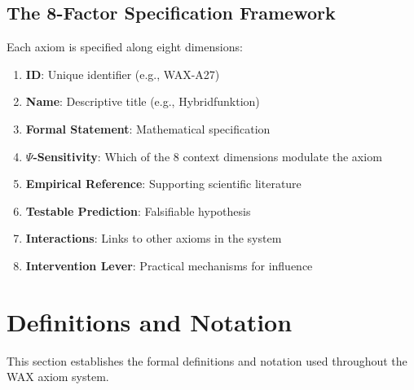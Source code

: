 \subsection{The 8-Factor Specification Framework}

Each axiom is specified along eight dimensions:

\begin{enumerate}
\item \textbf{ID}: Unique identifier (e.g., WAX-A27)
\item \textbf{Name}: Descriptive title (e.g., Hybridfunktion)
\item \textbf{Formal Statement}: Mathematical specification
\item \textbf{$\Psi$-Sensitivity}: Which of the 8 context dimensions modulate the axiom
\item \textbf{Empirical Reference}: Supporting scientific literature
\item \textbf{Testable Prediction}: Falsifiable hypothesis
\item \textbf{Interactions}: Links to other axioms in the system
\item \textbf{Intervention Lever}: Practical mechanisms for influence
\end{enumerate}






\section{Definitions and Notation}
\label{sec:av-definitions}

This section establishes the formal definitions and notation used throughout the WAX axiom system.


